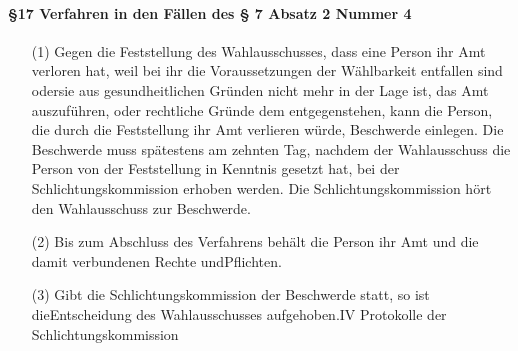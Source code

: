         \paragraph{§17 Verfahren in den Fällen des § 7 Absatz 2 Nummer 4}
            \begin{itemize}
                \item[(1)]    Gegen die Feststellung des Wahlausschusses, dass eine Person ihr Amt verloren hat, weil bei ihr die Voraussetzungen der Wählbarkeit entfallen sind odersie aus gesundheitlichen Gründen nicht mehr in der Lage ist, das Amt auszuführen, oder rechtliche Gründe dem entgegenstehen, kann die Person, die durch die Feststellung ihr Amt verlieren würde, Beschwerde einlegen. Die Beschwerde muss spätestens am zehnten Tag, nachdem der Wahlausschuss die Person von der Feststellung in Kenntnis gesetzt hat, bei der Schlichtungskommission erhoben werden. Die Schlichtungskommission hört den Wahlausschuss zur Beschwerde.
                \item[(2)]    Bis zum Abschluss des Verfahrens behält die Person ihr Amt und die damit verbundenen Rechte undPflichten.
                \item[(3)]    Gibt die Schlichtungskommission der Beschwerde statt, so ist dieEntscheidung des Wahlausschusses aufgehoben.IV Protokolle der Schlichtungskommission
            \end{itemize}
